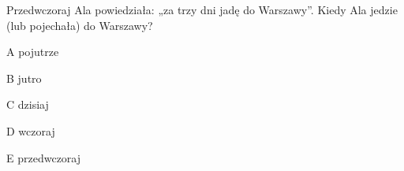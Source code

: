\begin{tresc}
Przedwczoraj Ala powiedziała: „za trzy dni jadę do Warszawy”. Kiedy Ala jedzie (lub pojechała) do Warszawy?
\end{tresc}
\begin{wariant}{A} pojutrze \end{wariant}
\begin{wariant}{B} jutro \end{wariant}
\begin{wariant}{C} dzisiaj \end{wariant}
\begin{wariant}{D} wczoraj \end{wariant}
\begin{wariant}{E} przedwczoraj \end{wariant}
